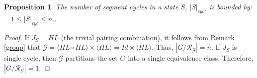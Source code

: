 \documentclass{article}
\newtheorem{proposition}{Proposition}[section]
\newtheorem{remark}{Remark}[section]
\begin{document}

\begin{proposition}
The number of segment cycles in a state $S$, $|S|_{cyc}$,  is bounded by: $\quad 1 \leq |S|_{cyc} \leq n.$.
\end{proposition}

\begin{proof}
If $J_S = HL$ (the trivial pairing combination), it follows from Remark \ref{group} that $\mathcal{G}=\langle HL \circ HL \rangle \times \langle HL \rangle = Id \times \langle HL \rangle$. Thus, $|G/\mathcal{R}_{\mathcal{G}}|=n$. 
If $J_S$ is single cycle, then $\mathcal{G}$ partitions the set $G$
into a single equivalence class. Therefore, $|G/\mathcal{R}_{\mathcal{G}}|=1$. 


\end{proof}

\end{document}

